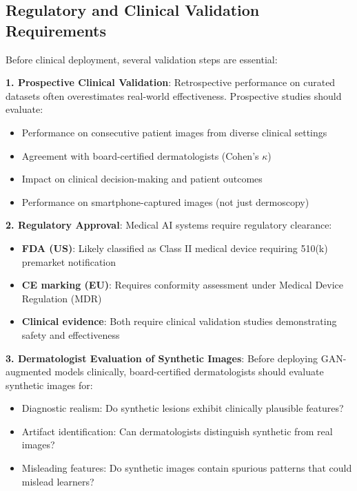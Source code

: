 \documentclass[10pt, twocolumn, letterpaper]{article}
\begin{document}
\subsection{Regulatory and Clinical Validation Requirements}

Before clinical deployment, several validation steps are essential:

\textbf{1. Prospective Clinical Validation}: Retrospective performance on curated datasets often overestimates real-world effectiveness. Prospective studies should evaluate:
\begin{itemize}[leftmargin=*, itemsep=2pt]
    \item Performance on consecutive patient images from diverse clinical settings
    \item Agreement with board-certified dermatologists (Cohen's $\kappa$)
    \item Impact on clinical decision-making and patient outcomes
    \item Performance on smartphone-captured images (not just dermoscopy)
\end{itemize}

\textbf{2. Regulatory Approval}: Medical AI systems require regulatory clearance:
\begin{itemize}[leftmargin=*, itemsep=2pt]
    \item \textbf{FDA (US)}: Likely classified as Class II medical device requiring 510(k) premarket notification
    \item \textbf{CE marking (EU)}: Requires conformity assessment under Medical Device Regulation (MDR)
    \item \textbf{Clinical evidence}: Both require clinical validation studies demonstrating safety and effectiveness
\end{itemize}

\textbf{3. Dermatologist Evaluation of Synthetic Images}: Before deploying GAN-augmented models clinically, board-certified dermatologists should evaluate synthetic images for:
\begin{itemize}[leftmargin=*, itemsep=2pt]
    \item Diagnostic realism: Do synthetic lesions exhibit clinically plausible features?
    \item Artifact identification: Can dermatologists distinguish synthetic from real images?
    \item Misleading features: Do synthetic images contain spurious patterns that could mislead learners?
\end{itemize}
\end{document}
